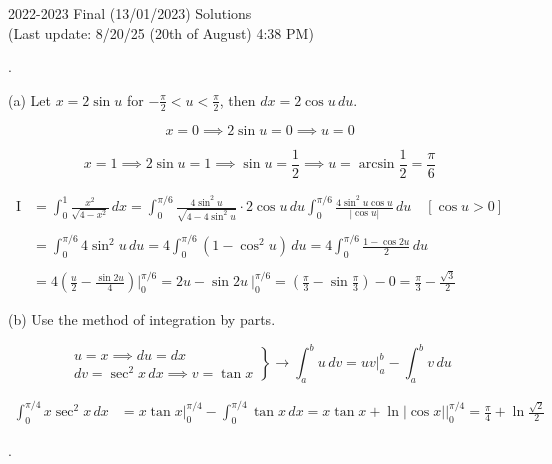 \documentclass{article}
\begin{document}
\newpage

\begin{center}
2022-2023 Final (13/01/2023) Solutions\\
(Last update: 8/20/25 (20th of August) 4:38 PM)
\end{center}

.

\hfill

\noindent (a) Let $x=2\sin u$ for $\displaystyle-\frac\pi2<u<\frac\pi2$, then $dx=2\cos u\,du$.

\[x=0\implies2\sin u=0\implies u=0\]

\[x=1\implies2\sin u=1\implies\sin u=\frac12\implies u=\arcsin\frac12=\frac\pi6\]

\begin{align*}
\mathrm{I}&=\int_0^1\frac{x^2}{\sqrt{4-x^2}}\,dx=\int_0^{\pi/6}\frac{4\sin^2u}{\sqrt{4-4\sin^2u}}\cdot2\cos u\,du\int_0^{\pi/6}\frac{4\sin^2u\cos u}{\left|\cos u\right|}\,du\quad\left[\cos u>0\right]\\\\&=\int_0^{\pi/6}4\sin^2u\,du=4\int_0^{\pi/6}\left(1-\cos^2u\right)\,du=4\int_0^{\pi/6}\frac{1-\cos2u}2\,du\\\\&=4\left(\frac u2-\frac{\sin 2u}4\right)\Bigg|_0^{\pi/6}=2u-\sin 2u\:\Bigg|_0^{\pi/6}=\left(\frac\pi3-\sin\frac\pi3\right)-0=\boxed{\frac\pi3-\frac{\sqrt3}2}
\end{align*}

\hfill

\noindent (b) Use the method of integration by parts.

\[\left.\begin{array}{c}
u=x\implies du=dx\\[1em]
dv=\sec^2x\,dx\implies\displaystyle v=\tan x
\end{array}\right\}\rightarrow\int_a^b u\,dv=uv\bigg|_a^b-\int_a^b v\,du\]

\begin{align*}\int_0^{\pi/4} x\sec^2x\,dx&=x\tan x\bigg|_0^{\pi/4}-\int_0^{\pi/4}\tan x\,dx=x\tan x+\ln\left|\cos x\right|\bigg|_0^{\pi/4}=\boxed{\frac\pi4+\ln\frac{\sqrt2}2}\end{align*}

\hfill

.

\hfill
\end{document}
